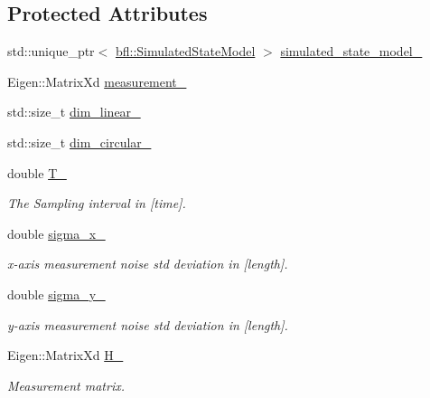\subsection*{Protected Attributes}
\begin{DoxyCompactItemize}
\item 
std\+::unique\+\_\+ptr$<$ \mbox{\hyperlink{classbfl_1_1SimulatedStateModel}{bfl\+::\+Simulated\+State\+Model}} $>$ \mbox{\hyperlink{classbfl_1_1SimulatedLinearSensor_ae98fc2009c715169118cbbd688a8ace7}{simulated\+\_\+state\+\_\+model\+\_\+}}
\item 
Eigen\+::\+Matrix\+Xd \mbox{\hyperlink{classbfl_1_1SimulatedLinearSensor_a1dab66fabc28a8bf798bff05230ab6be}{measurement\+\_\+}}
\item 
std\+::size\+\_\+t \mbox{\hyperlink{classbfl_1_1SimulatedLinearSensor_ab1ee148001c766ad2dff7b10e46aaa00}{dim\+\_\+linear\+\_\+}}
\item 
std\+::size\+\_\+t \mbox{\hyperlink{classbfl_1_1SimulatedLinearSensor_a6ee8182e6d190f02dd1137134ca8ee93}{dim\+\_\+circular\+\_\+}}
\item 
double \mbox{\hyperlink{classbfl_1_1LinearModel_a61e864670a689d32e6fc8be775f2ee86}{T\+\_\+}}
\begin{DoxyCompactList}\small\item\em The Sampling interval in \mbox{[}time\mbox{]}. \end{DoxyCompactList}\item 
double \mbox{\hyperlink{classbfl_1_1LinearModel_af6f8cd224c5e6e434dbba28032e8ecdd}{sigma\+\_\+x\+\_\+}}
\begin{DoxyCompactList}\small\item\em x-\/axis measurement noise std deviation in \mbox{[}length\mbox{]}. \end{DoxyCompactList}\item 
double \mbox{\hyperlink{classbfl_1_1LinearModel_a107c426bf4ec355672e778a1db137219}{sigma\+\_\+y\+\_\+}}
\begin{DoxyCompactList}\small\item\em y-\/axis measurement noise std deviation in \mbox{[}length\mbox{]}. \end{DoxyCompactList}\item 
Eigen\+::\+Matrix\+Xd \mbox{\hyperlink{classbfl_1_1LinearModel_a16918b937b83c701d78f713f529d1079}{H\+\_\+}}
\begin{DoxyCompactList}\small\item\em Measurement matrix. \end{DoxyCompactList}\item 

\end{DoxyCompactItemize}
